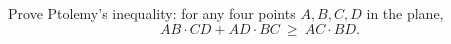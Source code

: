 Prove Ptolemy's inequality: for any four points $A,B,C,D$ in the plane,
\[
AB\cdot CD+AD\cdot BC\ \ge\ AC\cdot BD .
\]

